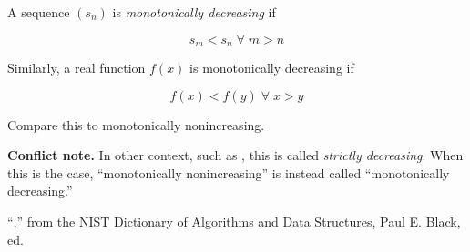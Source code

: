\documentclass{article}
\begin{document}
A sequence $(s_n)$ is \emph{monotonically decreasing} if 

$$ s_m < s_n \;\forall\; m > n $$

Similarly, a real function $f(x)$ is monotonically decreasing if

$$ f(x) < f(y) \;\forall\; x > y$$

Compare this to monotonically nonincreasing.

\textbf{Conflict note.} In other context, such as \cite{NIST}, this is called \emph{strictly decreasing}.  When this is the case, ``monotonically nonincreasing'' is instead called ``monotonically decreasing.'' 

\begin{thebibliography}{3}
  ``,'' from the NIST Dictionary of Algorithms and Data Structures, Paul E. Black, ed.
\end{thebibliography}
\end{document}
